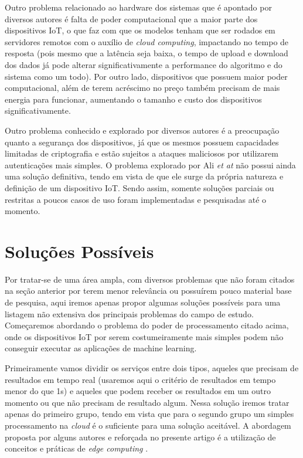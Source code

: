 \documentclass[12pt]{article}
\begin{document}
Outro problema relacionado ao hardware dos sistemas que é apontado por diversos autores é falta de poder computacional que a maior parte dos dispositivos IoT, o que faz com que os modelos tenham que ser rodados em servidores remotos com o auxílio de \emph{cloud computing}, impactando no tempo de resposta (pois mesmo que a latência seja baixa, o tempo de upload e download dos dados já pode alterar significativamente a performance do algoritmo e do sistema como um todo). Por outro lado, dispositivos que possuem maior poder computacional, além de terem acréscimo no preço também precisam de mais energia para funcionar, aumentando o tamanho e custo dos dispositivos significativamente.

Outro problema conhecido e explorado por diversos autores é a preocupação quanto a segurança dos dispositivos, já que os mesmos possuem capacidades limitadas de criptografia e estão sujeitos a ataques maliciosos por utilizarem autenticações mais simples. O problema explorado por Ali \emph{et at} \cite{ali} não possui ainda uma solução definitiva, tendo em vista de que ele surge da própria natureza e definição de um dispositivo IoT. Sendo assim, somente soluções parciais ou restritas a poucos casos de uso foram implementadas e pesquisadas até o momento.

\section{Soluções Possíveis}

Por tratar-se de uma área ampla, com diversos problemas que não foram citados na seção anterior por terem menor relevância ou possuírem pouco material base de pesquisa, aqui iremos apenas propor algumas soluções possíveis para uma listagem não extensiva dos principais problemas do campo de estudo. Começaremos abordando o problema do poder de processamento citado acima, onde os dispositivos IoT por serem costumeiramente mais simples podem não conseguir executar as aplicações de machine learning.

Primeiramente vamos dividir os serviços entre dois tipos, aqueles que precisam de resultados em tempo real (usaremos aqui o critério de resultados em tempo menor do que 1s) e aqueles que podem receber os resultados em um outro momento ou que não precisam de resultado algum. Nessa solução iremos tratar apenas do primeiro grupo, tendo em vista que para o segundo grupo um simples processamento na \emph{cloud} é o suficiente para uma solução aceitável. A abordagem proposta por alguns autores e reforçada no presente artigo é a utilização de conceitos e práticas de \emph{edge computing} \cite{vitali}.
\end{document}
